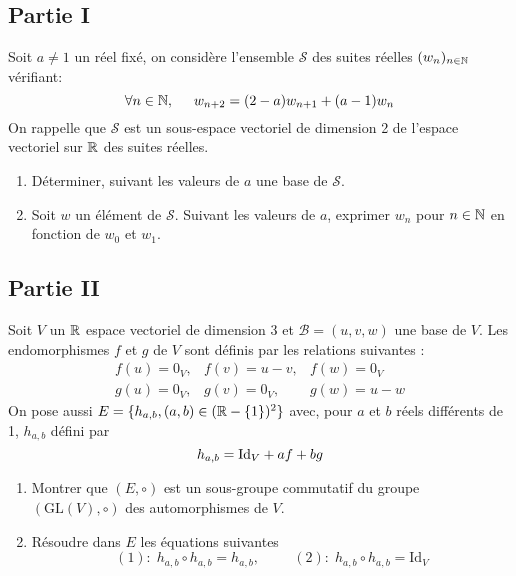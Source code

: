 \subsection*{Partie I}
Soit $a\neq 1$ un réel fixé, on considère l'ensemble $\mathcal{S}$ des suites réelles $(w_n)_{n\in\mathbb{N}}$ vérifiant:
\begin{displaymath}
\forall n \in \mathbb{N},\hspace{0.5cm}  
w_{n+2}=(2-a)w_{n+1}+(a-1)w_n
\end{displaymath}
On rappelle que $\mathcal{S}$ est un sous-espace vectoriel de dimension 2 de l'espace vectoriel sur $\mathbb{R}$ des suites réelles.
\begin{enumerate}
\item Déterminer, suivant les valeurs de $a$ une base de $\mathcal{S}$.
\item Soit $w$ un élément de $\mathcal{S}$. Suivant les valeurs de $a$, exprimer $w_n$ pour $n\in \mathbb{N}$ en fonction de $w_0$ et   $w_1$.
\end{enumerate}
\subsection*{Partie II}
Soit $V$ un $\mathbb{R}$ espace vectoriel de dimension 3 et $\mathcal{B}=(u,v,w)$ une base de $V$. Les endomorphismes $f$ et $g$ de $V$ sont définis par les relations suivantes :
\begin{displaymath}
\begin{array}{lll}
f(u)=0_V, & f(v)=u-v,  & f(w)= 0_V\\ 
g(u)=0_V, & g(v)=0_V, &  g(w)= u-w
\end{array}
\end{displaymath}
On pose aussi $E=\{h_{a,b}, (a,b)\in (\mathbb{R}-\{1\})^2\}$ avec, pour $a$ et $b$ réels différents de 1, $h_{a,b}$ défini par
\begin{displaymath}
h_{a,b}=\mathrm{Id}_V +a f + b g \\
\end{displaymath}
\begin{enumerate}
\item Montrer que $(E,\circ)$ est un sous-groupe commutatif du groupe $(\mathrm{GL}(V),\circ )$ des automorphismes de $V$.
\item Résoudre dans $E$ les équations suivantes
\begin{displaymath}
(1):\; h_{a,b}\circ h_{a,b} = h_{a,b},\hspace{1cm}
(2):\; h_{a,b}\circ h_{a,b} = \mathrm{Id}_V
\end{displaymath}
\end{enumerate}

